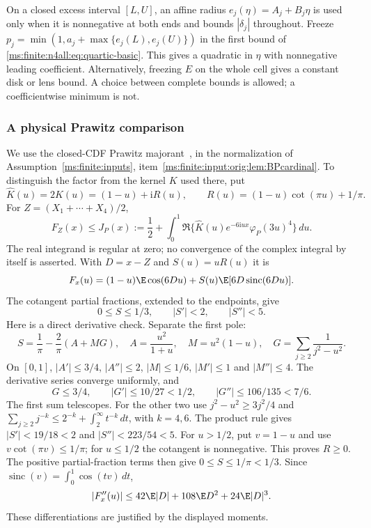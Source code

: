On a closed excess interval $[L,U]$, an affine radius
$e_j(\eta)=A_j+B_j\eta$ is used only when it is nonnegative at both
ends and bounds $|\delta_j|$ throughout. Freeze
$p_j=\min(1,a_j+\max\{e_j(L),e_j(U)\})$ in the first bound of
\eqref{ms:finite:n4all:eq:quartic-basic}. This gives a quadratic in $\eta$
with nonnegative leading coefficient. Alternatively, freezing $E$
on the whole cell gives a constant disk or lens bound. A choice
between complete bounds is allowed; a coefficientwise minimum is not.

\subsubsection{A physical Prawitz comparison}
We use the closed-CDF Prawitz majorant~\cite{Prawitz1972}, in the
normalization of Assumption~\ref{ms:finite:inputs}, item~\ref{ms:finite:input:orig:lem:BPcardinal}. To distinguish the
factor from the kernel $K$ used there, put
\[
 \widehat K(u)=2K(u)=(1-u)+\mathrm i R(u),\qquad
 R(u)=(1-u)\cot(\pi u)+1/\pi.
\]
For $Z=(X_1+\cdots+X_4)/2$,
\begin{equation}\label{ms:finite:n4all:eq:prawitz}
 F_Z(x)\le J_P(x):=\frac12+
 \int_0^1\Re\{\widehat K(u)e^{-6\mathrm i ux}\varphi_P(3u)^4\}\,du.
\end{equation}
The real integrand is regular at zero; no convergence of the complex
integral by itself is asserted. With $D=x-Z$ and $S(u)=uR(u)$ it is
\[
 F_x(u)=(1-u)\E\cos(6Du)+S(u)\E[6D\operatorname{sinc}(6Du)].
\]
The cotangent partial fractions, extended to the endpoints, give
\[
 0\le S\le1/3,\qquad |S'|<2,\qquad |S''|<5.
\]
Here is a direct derivative check. Separate the first pole:
\[
 S=\frac1\pi-\frac2\pi(A+MG),\quad
 A=\frac{u^2}{1+u},\quad M=u^2(1-u),\quad
 G=\sum_{j\ge2}\frac1{j^2-u^2}.
\]
On $[0,1]$, $|A'|\le3/4$, $|A''|\le2$, $|M|\le1/6$,
$|M'|\le1$ and $|M''|\le4$. The derivative series converge
uniformly, and
\[
 G\le3/4,\qquad |G'|\le10/27<1/2,\qquad
 |G''|\le106/135<7/6.
\]
The first sum telescopes. For the other two use
$j^2-u^2\ge3j^2/4$ and
$\sum_{j\ge2}j^{-k}\le2^{-k}+\int_2^\infty t^{-k}\,dt$,
with $k=4,6$. The product rule gives
$|S'|<19/18<2$ and $|S''|<223/54<5$.
For $u>1/2$, put $v=1-u$ and use
$v\cot(\pi v)\le1/\pi$; for $u\le1/2$ the cotangent is
nonnegative. This proves $R\ge0$. The positive partial-fraction
terms then give $0\le S\le1/\pi<1/3$.
Since $\operatorname{sinc}(v)=\int_0^1\cos(tv)\,dt$,
\begin{equation}\label{ms:finite:n4all:eq:integrand-curvature}
 |F_x''(u)|\le42\E|D|+108\E D^2+24\E|D|^3.
\end{equation}
These differentiations are justified by the displayed moments.

